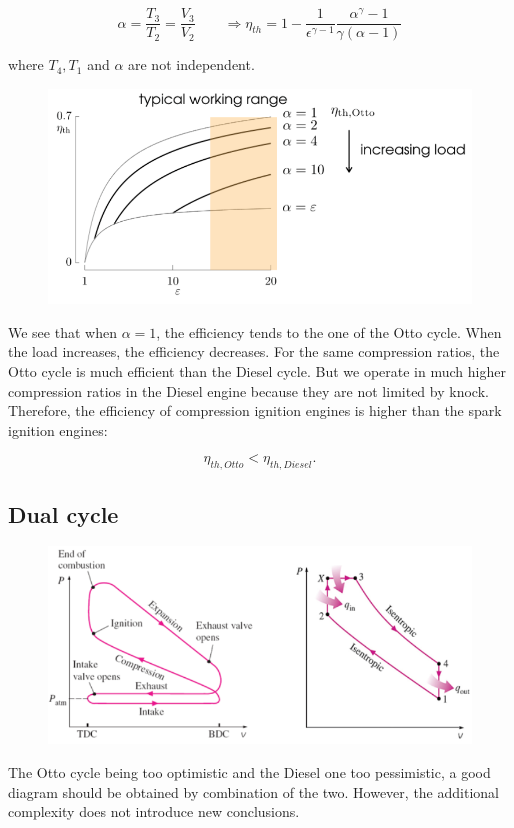 	\begin{equation}
	\alpha = \frac{T_3}{T_2}= \frac{V_3}{V_2} \qquad \Rightarrow \eta _{th} = 1 - \frac{1}{\epsilon ^{\gamma -1} }\frac{\alpha ^{\gamma}-1}{\gamma (\alpha -1)} 
	\end{equation}
	
	where $T_4, T_1$ and $\alpha$ are not independent. \\
	
	\begin{figure}
	\vspace{-5mm}
	\includegraphics[scale=0.4]{ch2/14}
	\label{fig:2.14}
	\end{figure}
	We see that when $\alpha = 1$, the efficiency tends to the one of the Otto cycle. When the load increases, the efficiency decreases. For the same compression ratios, the Otto cycle is much efficient than the Diesel cycle. But we operate in much higher compression ratios in the Diesel engine because they are not limited by knock. Therefore, the efficiency of compression ignition engines is higher than the spark ignition engines: 
	
	\begin{equation}
	\eta _{th, Otto} < 	\eta _{th, Diesel}.
	\end{equation}
	
\subsection{Dual cycle}
	\begin{figure}
	\vspace{-5mm}
	\includegraphics[scale=0.5]{ch2/15}
	\label{fig:2.15}
	\end{figure}
	The Otto cycle being too optimistic and the Diesel one too pessimistic, a good diagram should be obtained by combination of the two. However, the additional complexity does not introduce new conclusions. \\
	
